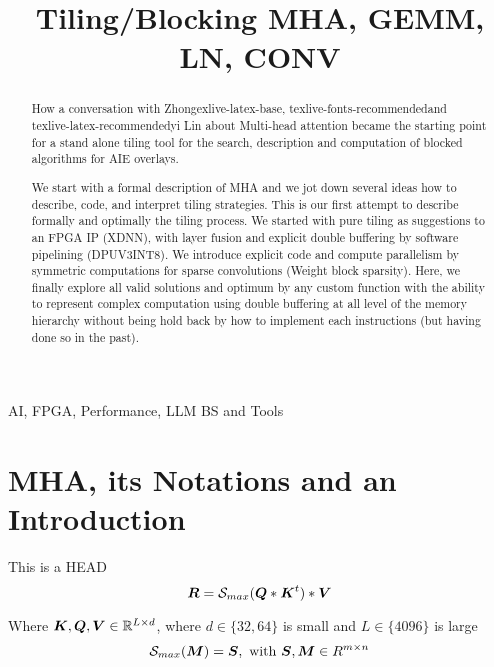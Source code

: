 \documentclass[journal]{IEEEtran}
\begin{document}
\title{Tiling/Blocking MHA, GEMM, LN, CONV }

\author{
}

\maketitle

\begin{abstract}
  How a conversation with Zhongexlive-latex-base, texlive-fonts-recommendedand texlive-latex-recommendedyi Lin about Multi-head attention
  became the starting point for a stand alone tiling tool for the
  search, description and computation of blocked algorithms for AIE
  overlays.

  We start with a formal description of MHA and we jot down several
  ideas how to describe, code, and interpret tiling strategies. This
  is our first attempt to describe formally and optimally the tiling
  process. We started with pure tiling as suggestions to an FPGA IP
  (XDNN), with layer fusion and explicit double buffering by software
  pipelining (DPUV3INT8). We introduce explicit code and compute
  parallelism by symmetric computations for sparse convolutions
  (Weight block sparsity). Here, we finally explore all valid
  solutions and optimum by any custom function with the ability to
  represent complex computation using double buffering at all level of
  the memory hierarchy without being hold back by how to implement
  each instructions (but having done so in the past).
  


  
\end{abstract}


\begin{IEEEkeywords}
 AI, FPGA, Performance, LLM BS and Tools
\end{IEEEkeywords}

\section{MHA, its Notations and an Introduction}
\label{sec:introduction}
This is a HEAD
\begin{equation}
  \Vc{R} = \Smax{\Vc{Q}*\Vc{K}^t}*\Vc{V}
\end{equation}

Where ${\boldsymbol K},{\boldsymbol Q},{\boldsymbol V} \in \mathbb{R} ^{L\times d}$, where $d\in\{32,64\}$ is small and $L \in \{4096\}$
is large
\begin{equation}
  \Smax{\Vc{M}}  = \Vc{S}, \text{ with } \Vc{S}, \Vc{M} \in R^{m\times n} \\
\end{equation}
\end{document}
